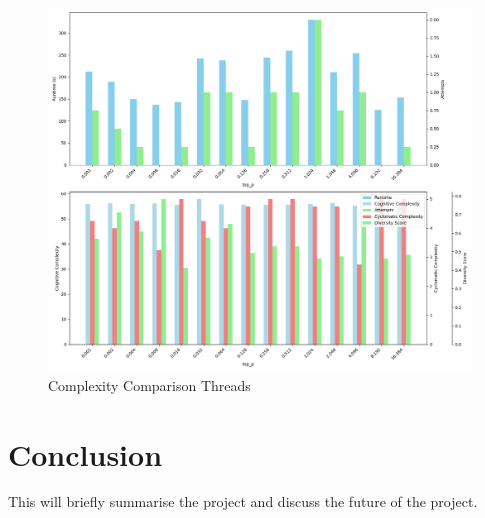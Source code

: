 \documentclass[12pt]{extarticle}
\begin{document}
\begin{figure}[h!]
\centering
\includegraphics[width=0.8\linewidth]{Images/Hyperparam_top_p_Comparison.png}
\caption{Complexity Comparison Threads}
\label{fig:Complexity_Comparison_Threads}
\end{figure}


\newpage
\section{Conclusion}

This will briefly summarise the project and discuss the future of the project.

\newpage
\end{document}

